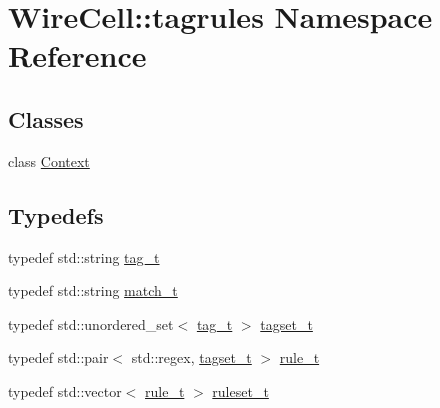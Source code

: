 \hypertarget{namespace_wire_cell_1_1tagrules}{}\section{Wire\+Cell\+:\+:tagrules Namespace Reference}
\label{namespace_wire_cell_1_1tagrules}
\subsection*{Classes}
\begin{DoxyCompactItemize}
\item 
class \hyperlink{class_wire_cell_1_1tagrules_1_1_context}{Context}
\end{DoxyCompactItemize}
\subsection*{Typedefs}
\begin{DoxyCompactItemize}
\item 
typedef std\+::string \hyperlink{namespace_wire_cell_1_1tagrules_ae74af6e8edaf0f64b70f6df4e0b66cdc}{tag\+\_\+t}
\item 
typedef std\+::string \hyperlink{namespace_wire_cell_1_1tagrules_ab71a655969745fcd6a4aecf278fa9333}{match\+\_\+t}
\item 
typedef std\+::unordered\+\_\+set$<$ \hyperlink{namespace_wire_cell_1_1tagrules_ae74af6e8edaf0f64b70f6df4e0b66cdc}{tag\+\_\+t} $>$ \hyperlink{namespace_wire_cell_1_1tagrules_a80263165e3d13e49e317c045829f76cb}{tagset\+\_\+t}
\item 
typedef std\+::pair$<$ std\+::regex, \hyperlink{namespace_wire_cell_1_1tagrules_a80263165e3d13e49e317c045829f76cb}{tagset\+\_\+t} $>$ \hyperlink{namespace_wire_cell_1_1tagrules_abc013e08147e32e1661654bb3e768151}{rule\+\_\+t}
\item 
typedef std\+::vector$<$ \hyperlink{namespace_wire_cell_1_1tagrules_abc013e08147e32e1661654bb3e768151}{rule\+\_\+t} $>$ \hyperlink{namespace_wire_cell_1_1tagrules_a93f5672d7c60d5f990b42dd93fd0aee2}{ruleset\+\_\+t}
\end{DoxyCompactItemize}

